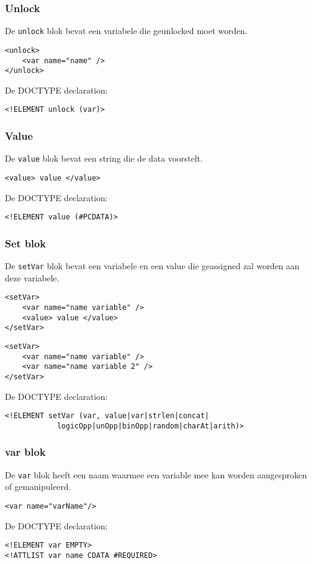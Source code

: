 \documentclass[]{article}
\begin{document}
\subsubsection{Unlock}
De \texttt{unlock} blok bevat een variabele die geunlocked moet worden.	
\lstset{language=XML}
\begin{lstlisting}
<unlock>
	<var name="name" />
</unlock>
\end{lstlisting}
De DOCTYPE declaration: 
\lstset{language=XML}
\begin{lstlisting}
<!ELEMENT unlock (var)>
\end{lstlisting}

\subsubsection{Value}
De \texttt{value} blok bevat een string die de data voorstelt. 
\lstset{language=XML}
\begin{lstlisting}
<value> value </value>
\end{lstlisting}
De DOCTYPE declaration: 
\lstset{language=XML}
\begin{lstlisting}
<!ELEMENT value (#PCDATA)>
\end{lstlisting}

\subsubsection{Set blok}
De \texttt{setVar} blok bevat een variabele en een value die geassigned zal worden aan deze variabele.
\lstset{language=XML}
\begin{lstlisting}
<setVar>
	<var name="name variable" />
	<value> value </value>
</setVar>
\end{lstlisting}
\lstset{language=XML}
\begin{lstlisting}
<setVar>
	<var name="name variable" />
	<var name="name variable 2" />
</setVar>
\end{lstlisting}
De DOCTYPE declaration: 
\lstset{language=XML}
\begin{lstlisting}
<!ELEMENT setVar (var, value|var|strlen|concat|
			logicOpp|unOpp|binOpp|random|charAt|arith)>
\end{lstlisting}
\subsubsection{var blok}
De \texttt{var} blok heeft een naam waarmee een variable mee kan worden aangesproken of gemanipuleerd.
\lstset{language=XML}
\begin{lstlisting}
<var name="varName"/>

\end{lstlisting}
De DOCTYPE declaration: 
\lstset{language=XML}
\begin{lstlisting}
<!ELEMENT var EMPTY>
<!ATTLIST var name CDATA #REQUIRED>
\end{lstlisting}
\end{document}
